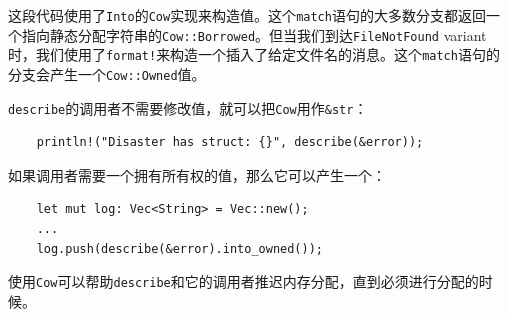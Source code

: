 这段代码使用了\texttt{Into}的\texttt{Cow}实现来构造值。这个\texttt{match}语句的大多数分支都返回一个指向静态分配字符串的\texttt{Cow::Borrowed}。但当我们到达\texttt{FileNotFound} variant时，我们使用了\texttt{format!}来构造一个插入了给定文件名的消息。这个\texttt{match}语句的分支会产生一个\texttt{Cow::Owned}值。

\texttt{describe}的调用者不需要修改值，就可以把\texttt{Cow}用作\texttt{\&str}：
\begin{verbatim}
    println!("Disaster has struct: {}", describe(&error));
\end{verbatim}

如果调用者需要一个拥有所有权的值，那么它可以产生一个：
\begin{verbatim}
    let mut log: Vec<String> = Vec::new();
    ...
    log.push(describe(&error).into_owned());
\end{verbatim}

使用\texttt{Cow}可以帮助\texttt{describe}和它的调用者推迟内存分配，直到必须进行分配的时候。
